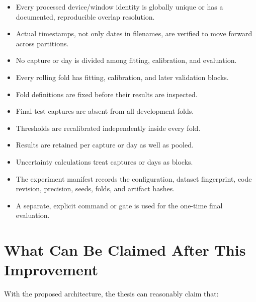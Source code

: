 \documentclass[11pt,a4paper]{article}
\begin{document}
\begin{itemize}

\item Every processed device/window identity is globally unique or has a
documented, reproducible overlap resolution.

\item Actual timestamps, not only dates in filenames, are verified to move
forward across partitions.

\item No capture or day is divided among fitting, calibration, and evaluation.

\item Every rolling fold has fitting, calibration, and later validation blocks.

\item Fold definitions are fixed before their results are inspected.

\item Final-test captures are absent from all development folds.

\item Thresholds are recalibrated independently inside every fold.

\item Results are retained per capture or day as well as pooled.

\item Uncertainty calculations treat captures or days as blocks.

\item The experiment manifest records the configuration, dataset fingerprint,
code revision, precision, seeds, folds, and artifact hashes.

\item A separate, explicit command or gate is used for the one-time final
evaluation.

\end{itemize}

\section{What Can Be Claimed After This Improvement}

With the proposed architecture, the thesis can reasonably claim that:
\end{document}
